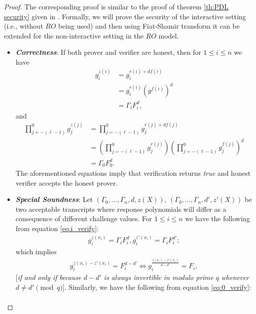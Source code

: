 \begin{proof}
  The corresponding proof is similar to the proof of theorem \ref{th:PDL security} given in \cite{cryptoeprint:2023/1669}. 
  Formally, we will prove the security of the interactive setting (i.e., without $RO$ being used) and then 
  using Fiat-Shamir transform it can be extended for the non-interactive setting in the $RO$ model. 

  \begin{itemize}
    \item \textit{\textbf{Correctness}}: If both prover and verifier are honest, then for $1\leq i\leq n$ 
      we have 
      \begin{align}\label{eq:i_verify}
        g_i^{z(i)}&=g_i^{r(i)+df(i)}\nonumber\\
        &=g_i^{r(i)}(g^{f(i)})^d\nonumber\\
        &=\Gamma_i F_i^d,
      \end{align}
      and 
      \begin{align}\label{eq:0_verify}
        \prod_{j=-(\ell-1)}^{0}g_j^{z(j)}&=\prod_{j=-(\ell-1)}^{0}g_j^{r(j)+df(j)}\nonumber\\
        &=(\prod_{j=-(\ell-1)}^{0}g_j^{r(j)})(\prod_{j=-(\ell-1)}^{0}g_j^{f(j)})^d\nonumber\\
        &=\Gamma_0 F_0^d.
      \end{align}
      The aforementioned equations imply that verification returns \textit{true} and honest verifier accepts the 
      honest prover.
    \item \textit{\textbf{Special Soundness}}: Let $(\Gamma_0,\dots,\Gamma_n,d,z(X))$, $(\Gamma_0,\dots,\Gamma_n,d',z'(X))$ 
      be two acceptable transcripts where response polynomials will differ as a consequence of different challenge 
      values. For $1\leq i\leq n$ we have the following from equation \ref{eq:i_verify}:
      \begin{align*}
        g_i^{z(x_i)}=\Gamma_i F_i^d,g_i^{z'(x_i)}=\Gamma_i F_i^{d'};
      \end{align*}
      which implies
      \begin{align}\label{eq:i_Equality}
        g_i^{z(x_i)-z'(x_i)}=F_i^{d-d'} \iff g_i^{\frac{z(x_i)-z'(x_i)}{d-d'}}=F_i,
      \end{align}
      [\textit{if and only if because $d-d'$ is always invertible in modulo prime $q$ whenever $d\neq d'\pmod{q}$}]. Similarly, 
      we have the following from equation \ref{eq:0_verify}:
      \begin{align*}

\end{align*}
\end{itemize}
\end{proof}
